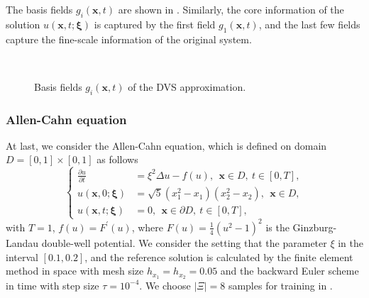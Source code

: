 \documentclass[10pt,a4paper]{article}
\numberwithin{equation}{section}
\numberwithin{lemma}{section}
\numberwithin{example}{section}
\numberwithin{definition}{section}
\numberwithin{assumption}{section}
\numberwithin{theorem}{section}
\numberwithin{proposition}{section}
\numberwithin{corollary}{section}
\numberwithin{remark}{section}
\begin{document}
	
The basis fields $g_i(\bm{x},t)$ are shown in . Similarly, the core information of the solution $u(\bm{x},t;\bm{\xi})$ is captured by the first field $g_1(\bm{x},t)$, and the last few fields capture the fine-scale information of the original system.
	\begin{figure}[htbp]
		\centering
		\\
		\caption{Basis fields $g_i(\bm{x},t)$ of the DVS approximation.}
		\label{fig_burgers.4}
	\end{figure}
	
	
	
	
\subsubsection{Allen-Cahn equation}
\label{num-ac}
At last, we consider the Allen-Cahn equation, which is defined on domain $D=[0,1]\times[0,1]$ as follows
	$$
		\left\{
		\begin{aligned}
			\frac{\partial u}{\partial t}&={\xi ^2} \Delta u -f(u),~~ \bm{x}\in D,~t\in[0,T],\\
			u(\bm{x},0;\bm{\xi})&=\sqrt{5}({x}_1^2-{x}_1)({x}_2^2-{x}_2),~~\bm{x}\in D,\\
			u(\bm{x},t;\bm{\xi})&=0,~~ \bm{x} \in \partial D,~t\in[0,T],
		\end{aligned}
		\right.
	$$
	with $T=1$, $f(u)=F^{'}(u)$, where $F(u)=\frac{1}{4}(u^2-1)^2$ is the Ginzburg-Landau double-well potential.
     We consider the setting that the parameter ${\xi}$ in the interval $[0.1,0.2]$, and the reference solution is calculated by the finite element method in space with mesh size $h_{{x}_1}=h_{{x}_2}=0.05$ and the backward Euler scheme in time with step size $\tau=10^{-4}$. 
     We choose $|\Xi|=8$ samples for training in .
   
\end{document}

